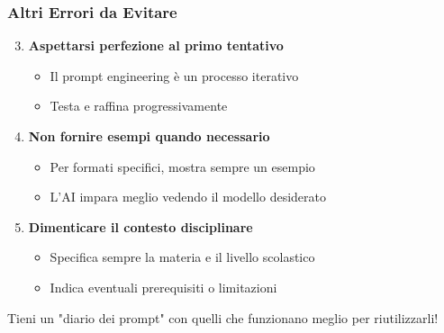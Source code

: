 \documentclass[aspectratio=169]{beamer}
\begin{document}
\begin{frame}
\frametitle{Altri Errori da Evitare}
\begin{enumerate}
    \setcounter{enumi}{2}
    \item \textbf{Aspettarsi perfezione al primo tentativo}
    \begin{itemize}
        \item Il prompt engineering è un processo iterativo
        \item Testa e raffina progressivamente
    \end{itemize}
    
    \item \textbf{Non fornire esempi quando necessario}
    \begin{itemize}
        \item Per formati specifici, mostra sempre un esempio
        \item L'AI impara meglio vedendo il modello desiderato
    \end{itemize}
    
    \item \textbf{Dimenticare il contesto disciplinare}
    \begin{itemize}
        \item Specifica sempre la materia e il livello scolastico
        \item Indica eventuali prerequisiti o limitazioni
    \end{itemize}
\end{enumerate}

\pause
\begin{tipbox}
Tieni un "diario dei prompt" con quelli che funzionano meglio per riutilizzarli!
\end{tipbox}
\end{frame}
%
\end{document}
